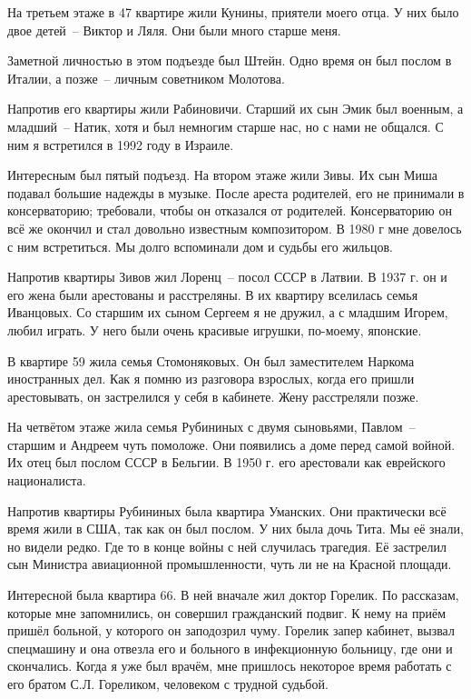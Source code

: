 На третьем этаже в 47 квартире жили Кунины, приятели моего отца. У них было двое детей~-- Виктор и Ляля. Они были много старше меня.

Заметной личностью в этом подъезде был Штейн. Одно время он был послом в Италии, а позже~-- личным советником Молотова.

Напротив его квартиры жили Рабиновичи. Старший их сын Эмик был военным, а младший~-- Натик, хотя и был немногим старше нас, но с нами не общался. С ним я встретился в 1992 году в Израиле.

Интересным был пятый подъезд. На втором этаже жили Зивы. Их сын Миша подавал большие надежды в музыке. После ареста родителей, его не принимали в консерваторию; требовали, чтобы он отказался от родителей. Консерваторию он всё же окончил и стал довольно известным композитором. В 1980 г мне довелось с ним встретиться. Мы долго вспоминали дом и судьбы его жильцов.

Напротив квартиры Зивов жил Лоренц~-- посол СССР в Латвии. В 1937 г. он и его жена были арестованы и расстреляны. В их квартиру вселилась семья Иванцовых. Со старшим их сыном Сергеем я не дружил, а с младшим Игорем, любил играть. У него были очень красивые игрушки, по-моему, японские.

В квартире 59 жила семья Стомоняковых. Он был заместителем Наркома иностранных дел. Как я помню из разговора взрослых, когда его пришли арестовывать, он застрелился у себя в кабинете. Жену расстреляли позже.

На четвётом этаже жила семья Рубининых с двумя сыновьями, Павлом~-- старшим и Андреем чуть помоложе. Они появились а доме перед самой войной. Их отец был послом СССР в Бельгии. В 1950 г. его арестовали как еврейского националиста.

Напротив квартиры Рубининых была квартира Уманских. Они практически всё время жили в США, так как он был послом. У них была дочь Тита. Мы её знали, но видели редко. Где то в конце войны с ней случилась трагедия. Её застрелил сын Министра авиационной промышленности, чуть ли не на Красной площади.

Интересной была квартира 66. В ней вначале жил доктор Горелик. По рассказам, которые мне запомнились, он совершил гражданский подвиг. К нему на приём пришёл больной, у которого он заподозрил чуму. Горелик запер кабинет, вызвал спецмашину и она отвезла его и больного в инфекционную больницу, где они и скончались. Когда я уже был врачём, мне пришлось некоторое время работать с его братом С.Л. Гореликом, человеком с трудной судьбой.

